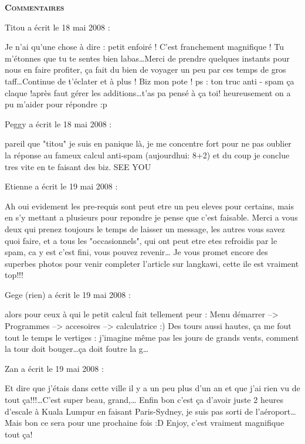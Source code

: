 \bigskip
\textbf{\textsc{Commentaires}}

\medskip
Titou a écrit le 18 mai 2008 :
\begin{displayquote}
Je n'ai qu'une chose à dire : petit enfoiré ! C'est franchement magnifique ! Tu m'étonnes que tu te sentes bien labas\dots Merci de prendre quelques instants pour nous en faire profiter, ça fait du bien de voyager un peu par ces temps de gros taff\dots Continue de t'éclater et à plus ! Biz mon pote !
ps : ton truc anti - spam ça claque !après faut gérer les additions\dots t'as pa pensé à ça toi! heureusement on a pu m'aider pour répondre :p
\end{displayquote}

\medskip
Peggy a écrit le 18 mai 2008 :
\begin{displayquote}
pareil que "titou" je suis en panique là, je me concentre fort pour ne pas oublier la réponse au fameux calcul anti-spam (aujourdhui: 8+2) et du coup je conclue tres vite en te faisant des biz.
SEE YOU
\end{displayquote}

\medskip
Etienne a écrit le 19 mai 2008 :
\begin{displayquote}
Ah oui evidement les pre-requis sont peut etre un peu eleves pour certains, mais en s'y mettant a plusieurs pour repondre je pense que c'est faisable.
Merci a vous deux qui prenez toujours le temps de laisser un message, les autres vous savez quoi faire, et a tous les "occasionnels", qui ont peut etre etes refroidis par le spam, ca y est c'est fini, vous pouvez revenir\dots
Je vous promet encore des superbes photos pour venir completer l'article sur langkawi, cette ile est vraiment top!!!
\end{displayquote}

\medskip
Gege (rien) a écrit le 19 mai 2008 :
\begin{displayquote}
alors pour ceux à qui le petit calcul fait tellement peur : Menu démarrer --> Programmes --> accesoires --> calculatrice :)
Des tours aussi hautes, ça me fout tout le temps le vertiges : j'imagine même pas les jours de grands vents, comment la tour doit bouger\dots ça doit foutre la g\dots
\end{displayquote}

\medskip
Zan a écrit le 19 mai 2008 :
\begin{displayquote}
Et dire que j'étais dans cette ville il y a un peu plus d'un an et que j'ai rien vu de tout ça!!!\dots C'est super beau, grand,\dots
Enfin bon c'est ça d'avoir juste 2 heures d'escale à Kuala Lumpur en faisant Paris-Sydney, je suis pas sorti de l'aéroport\dots Mais bon ce sera pour une prochaine fois :D
Enjoy, c'est vraiment magnifique tout ça!
\end{displayquote}

\vfill
